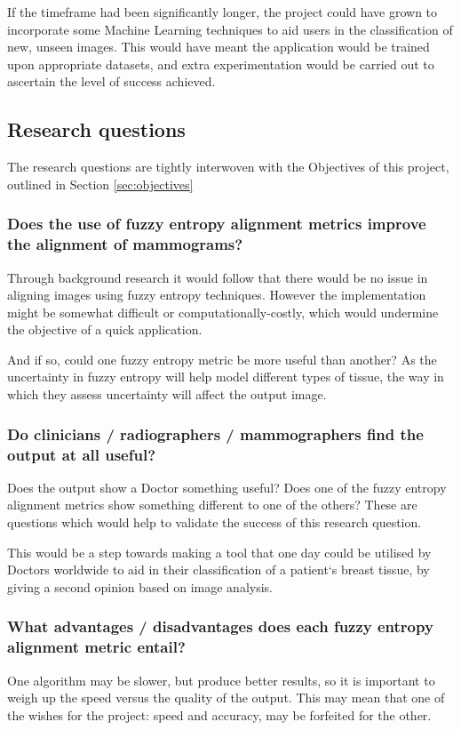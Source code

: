 If the timeframe had been significantly longer, the project could have grown to incorporate some Machine Learning techniques to aid users in the classification of new, unseen images. This would have meant the application would be trained upon appropriate datasets, and extra experimentation would be carried out to ascertain the level of success achieved.

\newpage
\subsection{Research questions}
\label{ssec:research-qs}

The research questions are tightly interwoven with the Objectives of this project, outlined in Section \ref{sec:objectives}

\subsubsection{Does the use of fuzzy entropy alignment metrics improve the alignment of mammograms?}

Through background research it would follow that there would be no issue in aligning images using fuzzy entropy techniques. However the implementation might be somewhat difficult or computationally-costly, which would undermine the objective of a quick application.

And if so, could one fuzzy entropy metric be more useful than another? As the uncertainty in fuzzy entropy will help model different types of tissue, the way in which they assess uncertainty will affect the output image.

\subsubsection{Do clinicians / radiographers / mammographers find the output at all useful?}

Does the output show a Doctor something useful? Does one of the fuzzy entropy alignment metrics show something different to one of the others? These are questions which would help to validate the success of this research question.

This would be a step towards making a tool that one day could be utilised by Doctors worldwide to aid in their classification of a patient`s breast tissue, by giving a second opinion based on image analysis.

\subsubsection{What advantages / disadvantages does each fuzzy entropy alignment metric entail?}

One algorithm may be slower, but produce better results, so it is important to weigh up the speed versus the quality of the output. This may mean that one of the wishes for the project: speed and accuracy, may be forfeited for the other.
